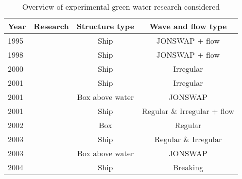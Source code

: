 \begin{table}[]
	\caption{Overview of experimental green water research considered}
	\begin{tabular}{ll|cc}
		\multicolumn{1}{l}{\textbf{Year}}      & \multicolumn{1}{l|}{\textbf{Research}}  & \multicolumn{1}{c}{\textbf{Structure type}} & \multicolumn{1}{c}{\textbf{Wave and flow type}}  \\ \hline 
		1995                                   &  \citet{Buchner1995}                            & Ship                                        & JONSWAP + flow                                 \\
		1998                                   & \citet{Hamoudi1998}                             & Ship                                        & JONSWAP + flow                                \\
		2000                                   & \citet{Ersdal2000}                             & Ship                                        & Irregular                            \\
		2001                                   & \citet{Stansberg2001}                           & Ship                                        & Irregular                              \\
		2001                                   & \citet{Cox2001}                               & Box above water                                        & JONSWAP                                \\
		2001                                   & \citet{Ogawa2001}                               & Ship                                        & Regular \& Irregular + flow                  \\
		2002                                   & \citet{Faltinsen2002}                         & Box                                         & Regular                               \\
		2003                                   & \citet{Ogawa2003}                               & Ship                                        & Regular \& Irregular                     \\
		2003                                   & \citet{Mori2003}                                & Box above water                                         & JONSWAP                               \\
		2004                                   & \citet{Greco2004}                               & Ship                                        & Breaking                                 \\

\end{tabular}
\end{table}
